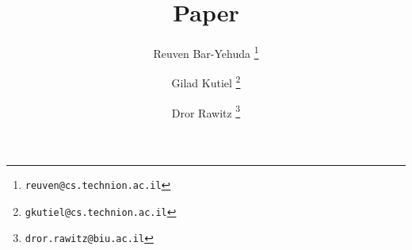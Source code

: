 \title{Paper}

\author[1]{Reuven Bar-Yehuda	\thanks{\texttt{reuven@cs.technion.ac.il}}}
\author[1]{Gilad Kutiel			\thanks{\texttt{gkutiel@cs.technion.ac.il}}}
\author[2]{Dror Rawitz			\thanks{\texttt{dror.rawitz@biu.ac.il}}}


\date{}